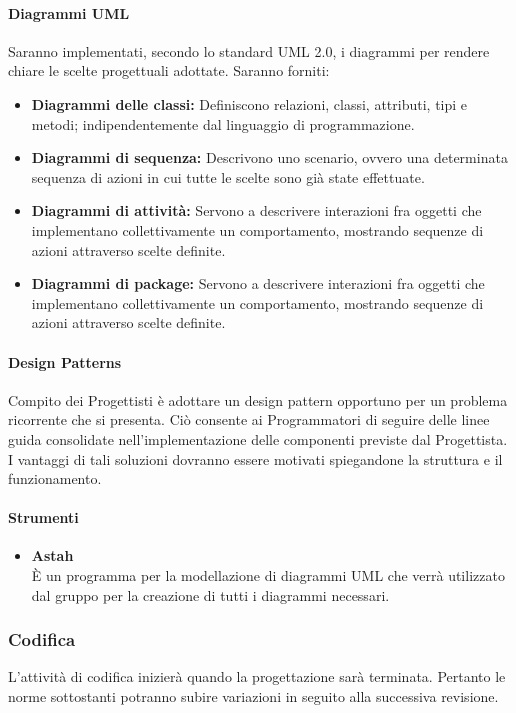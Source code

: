 \documentclass[11pt,a4paper]{article}
\begin{document}
{	\paragraph{Diagrammi UML\\} 
	Saranno implementati, secondo lo standard UML 2.0, i diagrammi per rendere chiare le scelte progettuali adottate. Saranno forniti:
	\begin{itemize}
		\item \textbf{Diagrammi delle classi:} Definiscono relazioni, classi, attributi, tipi e metodi; indipendentemente dal linguaggio di programmazione.
		\item \textbf{Diagrammi di sequenza:} Descrivono uno scenario, ovvero una determinata sequenza di azioni in cui tutte le scelte sono già state effettuate.
		\item \textbf{Diagrammi di attività:} Servono a descrivere interazioni fra oggetti che implementano collettivamente un comportamento, mostrando sequenze di azioni attraverso scelte definite.
		\item \textbf{Diagrammi di package:} Servono a descrivere interazioni fra oggetti che implementano collettivamente un comportamento, mostrando sequenze di azioni attraverso scelte definite.
	\end{itemize}
	\paragraph{Design Patterns\\}
	Compito dei Progettisti è adottare un design pattern opportuno per un problema ricorrente che si presenta. Ciò consente ai Programmatori di seguire delle linee guida consolidate nell'implementazione delle componenti previste dal Progettista. I vantaggi di tali soluzioni dovranno essere motivati spiegandone la struttura e il funzionamento.
	\paragraph{Strumenti}
	\begin{itemize}
		\item{\textbf{Astah}\noindent \\
		È un programma per la modellazione di diagrammi UML che verrà utilizzato dal gruppo per la creazione di tutti i diagrammi necessari.}
	\end{itemize}
	
	
	\subsubsection{Codifica}
	L'attività di codifica inizierà quando la progettazione sarà terminata. Pertanto le norme sottostanti potranno subire variazioni in seguito alla successiva revisione.
	

}
\end{document}
